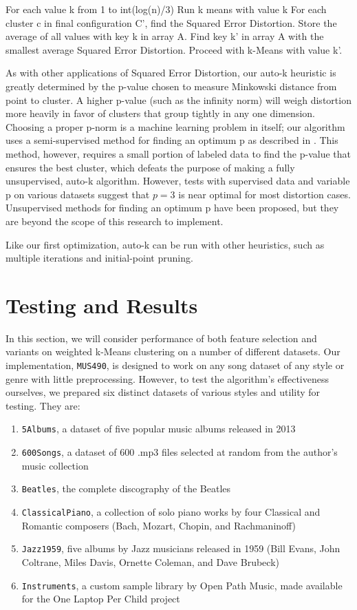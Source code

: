 \documentclass[10pt,twocolumn]{article}
\begin{document}
For each value k from 1 to int(log(n)/3)
		Run k means with value k
For each cluster c in final configuration C’, find the Squared Error Distortion. Store the average of all values with key k in array A.
	Find key k’ in array A with the smallest average Squared Error Distortion.
	Proceed with k-Means with value k’.


As with other applications of Squared Error Distortion, our auto-k heuristic is greatly determined by the p-value chosen to measure Minkowski distance from point to cluster. A higher p-value (such as the infinity norm) will weigh distortion more heavily in favor of clusters that group tightly in any one dimension. Choosing a proper p-norm is a machine learning problem in itself; our algorithm uses a semi-supervised method for finding an optimum p as described in \cite{SemiSupPNorm}. This method, however, requires a small portion of labeled data to find the p-value that ensures the best cluster, which defeats the purpose of making a fully unsupervised, auto-k algorithm. However, tests with supervised data and variable p on various datasets suggest that $p = 3$ is near optimal for most distortion cases. Unsupervised methods for finding an optimum p have been proposed, \cite{SemiSupPNorm} but they are beyond the scope of this research to implement. 

Like our first optimization, auto-k can be run with other heuristics, such as multiple iterations and initial-point pruning. 


\section{Testing and Results}
\label{sec:testing}


In this section, we will consider performance of both feature selection and variants on weighted k-Means clustering on a number of different datasets. Our implementation, \texttt{MUS490}, is designed to work on any song dataset of any style or genre with little preprocessing. However, to test the algorithm’s effectiveness ourselves, we prepared six distinct datasets of various styles and utility for testing. They are:
\begin{enumerate}
\item{\texttt{5Albums}, a dataset of five popular music albums released in 2013}
\item{\texttt{600Songs}, a dataset of 600 .mp3 files selected at random from the author’s music collection}
\item{\texttt{Beatles}, the complete discography of the Beatles}
\item{\texttt{ClassicalPiano}, a collection of solo piano works by four Classical and Romantic composers (Bach, Mozart, Chopin, and Rachmaninoff)}
\item{\texttt{Jazz1959}, five albums by Jazz musicians released in 1959 (Bill Evans, John Coltrane, Miles Davis, Ornette Coleman, and Dave Brubeck)}
\item{\texttt{Instruments}, a custom sample library by Open Path Music, made available for the One Laptop Per Child project} \cite{OpenPathMusic}
\end{enumerate}
\end{document}
